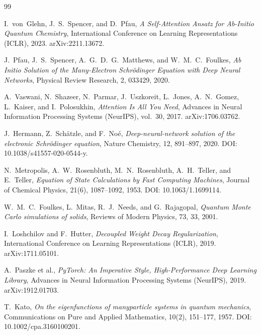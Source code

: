 \begin{thebibliography}{99}

I.~von~Glehn, J.~S.~Spencer, and D.~Pfau,
\newblock \emph{A Self-Attention Ansatz for Ab-Initio Quantum Chemistry},
\newblock International Conference on Learning Representations (ICLR), 2023.
\newblock arXiv:2211.13672.

J.~Pfau, J.~S.~Spencer, A.~G.~D.~G.~Matthews, and W.~M.~C.~Foulkes,
\newblock \emph{Ab Initio Solution of the Many-Electron Schr{\"o}dinger Equation with Deep Neural Networks},
\newblock Physical Review Research, 2, 033429, 2020.

A.~Vaswani, N.~Shazeer, N.~Parmar, J.~Uszkoreit, L.~Jones, A.~N.~Gomez, L.~Kaiser, and I.~Polosukhin,
\newblock \emph{Attention Is All You Need},
\newblock Advances in Neural Information Processing Systems (NeurIPS), vol.~30, 2017.
\newblock arXiv:1706.03762.

J.~Hermann, Z.~Sch{\"a}tzle, and F.~No{\'e},
\newblock \emph{Deep-neural-network solution of the electronic Schr{\"o}dinger equation},
\newblock Nature Chemistry, 12, 891--897, 2020.
\newblock DOI: 10.1038/s41557-020-0544-y.

N.~Metropolis, A.~W.~Rosenbluth, M.~N.~Rosenbluth, A.~H.~Teller, and E.~Teller,
\newblock \emph{Equation of State Calculations by Fast Computing Machines},
\newblock Journal of Chemical Physics, 21(6), 1087--1092, 1953.
\newblock DOI: 10.1063/1.1699114.

W.~M.~C.~Foulkes, L.~Mitas, R.~J.~Needs, and G.~Rajagopal,
\newblock \emph{Quantum Monte Carlo simulations of solids},
\newblock Reviews of Modern Physics, 73, 33, 2001.

I.~Loshchilov and F.~Hutter,
\newblock \emph{Decoupled Weight Decay Regularization},
\newblock International Conference on Learning Representations (ICLR), 2019.
\newblock arXiv:1711.05101.

A.~Paszke et al.,
\newblock \emph{PyTorch: An Imperative Style, High-Performance Deep Learning Library},
\newblock Advances in Neural Information Processing Systems (NeurIPS), 2019.
\newblock arXiv:1912.01703.

T.~Kato,
\newblock \emph{On the eigenfunctions of many\-particle systems in quantum mechanics},
\newblock Communications on Pure and Applied Mathematics, 10(2), 151--177, 1957.
\newblock DOI: 10.1002/cpa.3160100201.

\end{thebibliography}


